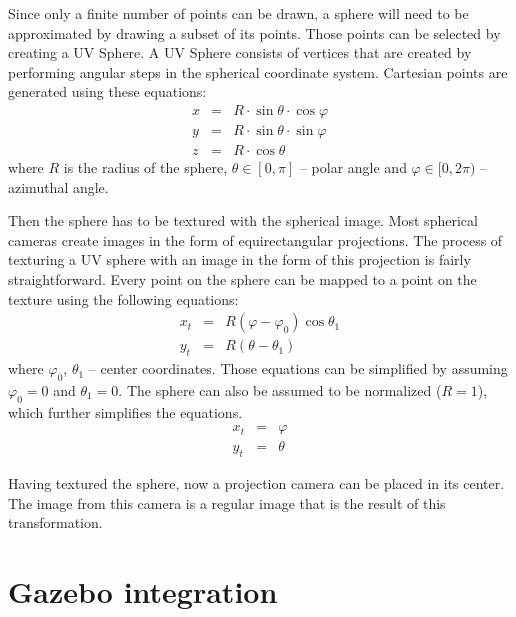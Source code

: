 \documentclass{svproc}
\begin{document}
Since only a finite number of points can be drawn, a sphere will need to be approximated by drawing a subset of its points.
Those points can be selected by creating a UV Sphere.
A UV Sphere consists of vertices that are created by performing angular steps in the spherical coordinate system.
Cartesian points are generated using these equations:
\begin{eqnarray}
    x &=& R \cdot \sin \theta \cdot \cos \varphi \\
    y &=& R \cdot \sin \theta \cdot \sin \varphi \\
    z &=& R \cdot \cos \theta
\end{eqnarray}
where $R$ is the radius of the sphere, $\theta \in [0, \pi]$ -- polar angle and $\varphi \in [0, 2\pi)$ -- azimuthal angle.

Then the sphere has to be textured with the spherical image.
Most spherical cameras create images in the form of equirectangular projections.
The process of texturing a UV sphere with an image in the form of this projection is fairly straightforward. \cite{greene1986environment} 
Every point on the sphere can be mapped to a point on the texture using the following equations:
\begin{eqnarray}
    x_t &=& R(\varphi - \varphi_0) \cos \theta_1 \\
    y_t &=& R(\theta - \theta_1)
\end{eqnarray}
where $\varphi_0$, $\theta_1$ -- center coordinates.
Those equations can be simplified by assuming $\varphi_0 = 0$ and $\theta_1 = 0$.
The sphere can also be assumed to be normalized ($R = 1$), which further simplifies the equations.
\begin{eqnarray}
    x_t &=& \varphi \\
    y_t &=& \theta
\end{eqnarray}

Having textured the sphere, now a projection camera can be placed in its center.
The image from this camera is a regular image that is the result of this transformation.

\section{Gazebo integration}
\end{document}
